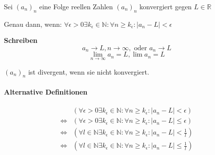 \documentclass[fleqn]{scrartcl}
\begin{document}
Sei $(a_n)_n$ eine Folge reellen Zahlen $(a_n)_n$ konvergiert gegen $L \in \mathbb{R}$

Genau dann, wenn: $\forall \epsilon > 0 \exists k_\epsilon \in \mathbb{N}: \forall n \geq k_\epsilon: |a_n - L| < \epsilon$

\textbf{Schreiben} 
\[a_n \to L, n\to \infty, \text{ oder } a_n \to L\]
\[\lim_{n \to \infty} a_n = L, \lim a_n = L\]

$(a_n)_n$ ist divergent, wenn sie nicht konvergiert.

\paragraph{Alternative Definitionen} 

\begin{align*}
                      & \left(\forall \epsilon > 0 \exists k_\epsilon \in \mathbb{N}: \forall n \geq k_\epsilon: |a_n - L| < \epsilon \right) \\
  \Longleftrightarrow & \left(\forall \epsilon > 0 \exists k_\epsilon \in \mathbb{N}: \forall n \geq k_\epsilon: |a_n - L| \leq \epsilon \right) \\
  \Longleftrightarrow & \left(\forall l \in \mathbb{N} \exists k_\epsilon \in \mathbb{N}: \forall n \geq k_\epsilon: |a_n - L| < \frac{1}{l} \right) \\
  \Longleftrightarrow & \left(\forall l \in \mathbb{N} \exists k_\epsilon \in \mathbb{N}: \forall n \geq k_\epsilon: |a_n - L| \leq \frac{1}{l} \right) 
\end{align*}
\end{document}
